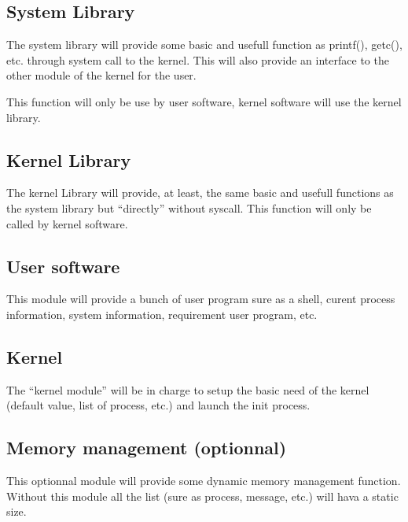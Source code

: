 \subsection{System Library}

The system library will provide some basic and usefull function as printf(), getc(), etc. through system call to the kernel. This will also provide an interface to the other module of the kernel for the user.

This function will only be use by user software, kernel software will use the kernel library.

\subsection{Kernel Library}

The kernel Library will provide, at least, the same basic and usefull functions as the system library but ``directly'' without syscall. This function will only be called by kernel software.

\subsection{User software}

This module will provide a bunch of user program sure as a shell, curent process information, system information, requirement user program, etc.

\subsection{Kernel}

The ``kernel module'' will be in charge to setup the basic need of the kernel (default value, list of process, etc.) and launch the init process.

\subsection{Memory management (optionnal)}

This optionnal module will provide some dynamic memory management function. Without this module all the list (sure as process, message, etc.) will hava a static size.

